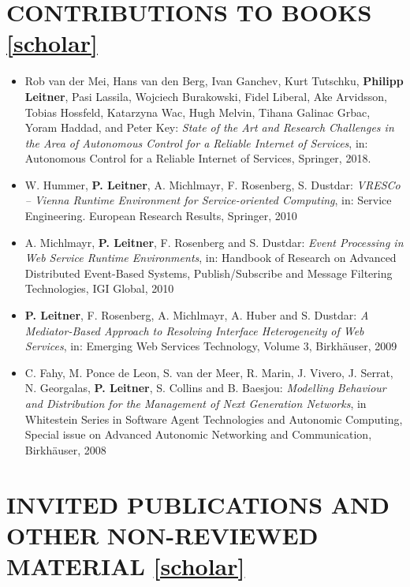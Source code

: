 \documentclass[paper=letter,fontsize=11pt]{scrartcl} %
\newcommand{\NewPart}[2]{\section*{\uppercase{#1} #2}}
\begin{document}
\NewPart{Contributions to Books}{\href{https://scholar.google.ch/citations?user=wZ9f8CAAAAAJ}{[scholar]}}

\begin{itemize}
	\item Rob van der Mei, Hans van den Berg, Ivan Ganchev, Kurt Tutschku, \textbf{Philipp Leitner}, Pasi Lassila, Wojciech Burakowski, Fidel Liberal, Ake Arvidsson, Tobias Hossfeld, Katarzyna Wac, Hugh Melvin, Tihana Galinac Grbac, Yoram Haddad, and Peter Key:
	\emph{State of the Art and Research Challenges in the Area of Autonomous Control for a Reliable Internet of Services},
	in: Autonomous Control for a Reliable Internet of Services, Springer, 2018.
\item W. Hummer, \textbf{P. Leitner}, A. Michlmayr, F. Rosenberg, S. Dustdar:
\emph{VRESCo -- Vienna Runtime Environment for Service-oriented Computing},
in: Service Engineering. European Research Results, Springer, 2010
\item A. Michlmayr, \textbf{P. Leitner}, F. Rosenberg and S. Dustdar: \emph{Event
Processing in Web Service Runtime Environments}, in: Handbook of
Research on Advanced Distributed Event-Based Systems, Publish/Subscribe and
Message Filtering Technologies, IGI Global, 2010
\item \textbf{P. Leitner}, F. Rosenberg, A. Michlmayr, A. Huber and S. Dustdar:
\emph{A Mediator-Based Approach to Resolving Interface Heterogeneity of Web
Services}, in: Emerging Web Services Technology, Volume 3,
Birkh\"auser, 2009
\item C. Fahy, M. Ponce de Leon, S. van der Meer, R. Marin, J. Vivero, J. Serrat,
N. Georgalas, \textbf{P. Leitner}, S. Collins and B. Baesjou: \emph{Modelling
Behaviour and Distribution for the Management of Next Generation Networks},
in Whitestein Series in Software Agent Technologies and Autonomic
Computing, Special issue on Advanced Autonomic Networking and Communication,
Birkh\"auser, 2008
\end{itemize}

\NewPart{Invited Publications and Other Non-Reviewed Material}{\href{https://scholar.google.ch/citations?user=wZ9f8CAAAAAJ}{[scholar]}}
\end{document}
